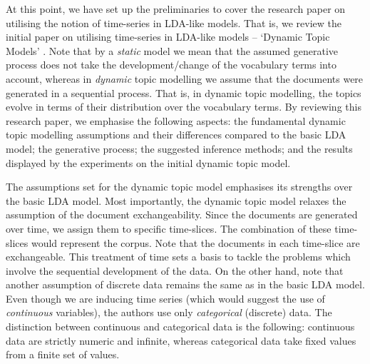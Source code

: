\documentclass{mprop}
\begin{document}
\par At this point, we have set up the preliminaries to cover the research paper on utilising the notion of time-series in LDA-like models. That is, we review the initial paper on utilising time-series in LDA-like models -- `Dynamic Topic Models' \cite{blei_2006}. Note that by a \textit{static} model we mean that the assumed generative process does not take the development/change of the vocabulary terms into account, whereas in \textit{dynamic} topic modelling we assume that the documents were generated in a sequential process. That is, in dynamic topic modelling, the topics evolve in terms of their distribution over the vocabulary terms. By reviewing this research paper, we emphasise the following aspects: the fundamental dynamic topic modelling assumptions and their differences compared to the basic LDA model; the generative process; the suggested inference methods; and the results displayed by the experiments on the initial dynamic topic model.

\par The assumptions set for the dynamic topic model emphasises its strengths over the basic LDA model. Most importantly, the dynamic topic model relaxes the assumption of the document exchangeability. Since the documents are generated over time, we assign them to specific time-slices. The combination of these time-slices would represent the corpus. Note that the documents in each time-slice are exchangeable. This treatment of time sets a basis to tackle the problems which involve the sequential development of the data. On the other hand, note that another assumption of discrete data remains the same as in the basic LDA model. Even though we are inducing time series (which would suggest the use of \textit{continuous} variables), the authors use only \textit{categorical} (discrete) data. The distinction between continuous and categorical data is the following: continuous data are strictly numeric and infinite, whereas categorical data take fixed values from a finite set of values. 
\end{document}
